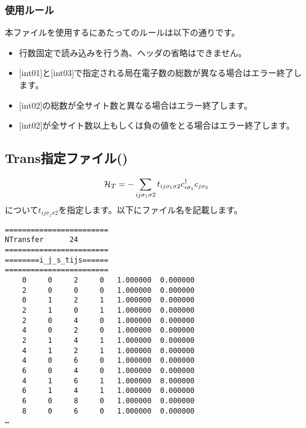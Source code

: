 \subsubsection{使用ルール}
本ファイルを使用するにあたってのルールは以下の通りです。
\begin{itemize}
\item 行数固定で読み込みを行う為、ヘッダの省略はできません。
\item $[$int01$]$と$[$int03$]$で指定される局在電子数の総数が異なる場合はエラー終了します。
\item $[$int02$]$の総数が全サイト数と異なる場合はエラー終了します。
\item $[$int02$]$が全サイト数以上もしくは負の値をとる場合はエラー終了します。
\end{itemize}


\newpage
\subsection{Trans指定ファイル()}
\label{Subsec:Trans}
\begin{align}
{\cal H}_T =-\sum_{ij\sigma_1\sigma2} t_{ij\sigma_1\sigma2}c_{i\sigma_1}^{\dag}c_{j\sigma_2}
\end{align}
について$t_{ij\sigma_1\sigma2}$を指定します。以下にファイル名を記載します。\\
\begin{minipage}{12.5cm}
\begin{screen}
\begin{verbatim}
======================== 
NTransfer      24  
======================== 
========i_j_s_tijs====== 
======================== 
    0     0     2     0   1.000000  0.000000
    2     0     0     0   1.000000  0.000000
    0     1     2     1   1.000000  0.000000
    2     1     0     1   1.000000  0.000000
    2     0     4     0   1.000000  0.000000
    4     0     2     0   1.000000  0.000000
    2     1     4     1   1.000000  0.000000
    4     1     2     1   1.000000  0.000000
    4     0     6     0   1.000000  0.000000
    6     0     4     0   1.000000  0.000000
    4     1     6     1   1.000000  0.000000
    6     1     4     1   1.000000  0.000000
    6     0     8     0   1.000000  0.000000
    8     0     6     0   1.000000  0.000000
…
\end{verbatim}
\end{screen}
\end{minipage}

